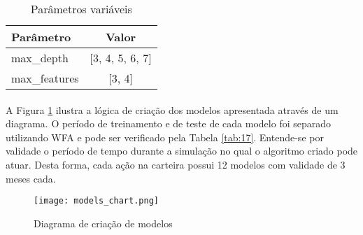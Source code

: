 \begin{table}[!htb]
    \begin{center}
        \begin{tabular}{ l|c }
            Parâmetro & Valor \\
            \hline
            max\_depth & [3, 4, 5, 6, 7] \\
            max\_features & [3, 4] \\
        \end{tabular}
        \caption{Parâmetros variáveis}
        \label{tab:16}
    \end{center}
\end{table}

\paragraph{} A Figura \ref{fig:580} ilustra a lógica de criação dos modelos apresentada através de um diagrama. O período de treinamento e de teste de cada modelo foi separado utilizando WFA e pode ser verificado pela Tabela \ref{tab:17}. Entende-se por validade o período de tempo durante a simulação no qual o algoritmo criado pode atuar. Desta forma, cada ação na carteira possui 12 modelos com validade de 3 meses cada.

\begin{figure}[!htb]
    \texttt{[image: models\_chart.png]}
    \centering
    \caption{Diagrama de criação de modelos}
    \label{fig:580}
\end{figure}

